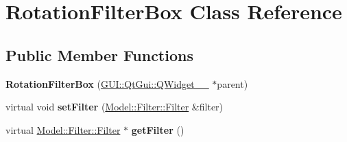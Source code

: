 \hypertarget{classGUI_1_1RotationFilterBox}{}\section{Rotation\+Filter\+Box Class Reference}
\label{classGUI_1_1RotationFilterBox}
\subsection*{Public Member Functions}
\begin{DoxyCompactItemize}
\item 
\hypertarget{classGUI_1_1RotationFilterBox_af4b29c6e38dd8416e5bd04a7b9145dc9}{}{\bfseries Rotation\+Filter\+Box} (\hyperlink{classGUI_1_1QtGui_1_1QWidget____10}{G\+U\+I\+::\+Qt\+Gui\+::\+Q\+Widget\+\_\+\+\_} $\ast$parent)\label{classGUI_1_1RotationFilterBox_af4b29c6e38dd8416e5bd04a7b9145dc9}

\item 
\hypertarget{classGUI_1_1RotationFilterBox_ad7c0ee00fe3faac7942d75eec2a5342b}{}virtual void {\bfseries set\+Filter} (\hyperlink{classModel_1_1Filter_1_1Filter}{Model\+::\+Filter\+::\+Filter} \&filter)\label{classGUI_1_1RotationFilterBox_ad7c0ee00fe3faac7942d75eec2a5342b}

\item 
\hypertarget{classGUI_1_1RotationFilterBox_acef2029a93f4ab3a538cdb643b9c2613}{}virtual \hyperlink{classModel_1_1Filter_1_1Filter}{Model\+::\+Filter\+::\+Filter} $\ast$ {\bfseries get\+Filter} ()\label{classGUI_1_1RotationFilterBox_acef2029a93f4ab3a538cdb643b9c2613}

\end{DoxyCompactItemize}
